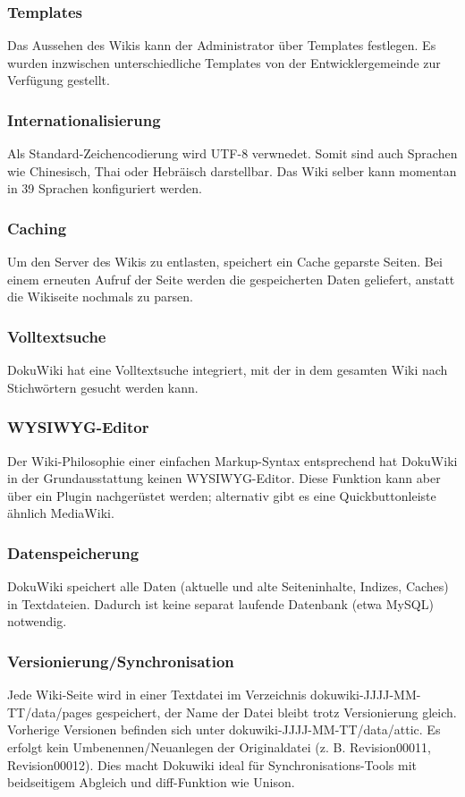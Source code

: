 \subsubsection{Templates}
Das Aussehen des Wikis kann der Administrator über Templates festlegen. Es wurden inzwischen unterschiedliche Templates von der Entwicklergemeinde zur Verfügung gestellt.
\subsubsection{Internationalisierung}
Als Standard-Zeichencodierung wird UTF-8 verwnedet. Somit sind auch Sprachen wie Chinesisch, Thai oder Hebräisch darstellbar. Das Wiki selber kann momentan in 39 Sprachen konfiguriert werden.
\subsubsection{Caching}
Um den Server des Wikis zu entlasten, speichert ein Cache geparste Seiten. Bei einem erneuten Aufruf der Seite werden die gespeicherten Daten geliefert, anstatt die Wikiseite nochmals zu parsen.
\subsubsection{Volltextsuche}
DokuWiki hat eine Volltextsuche integriert, mit der in dem gesamten Wiki nach Stichwörtern gesucht werden kann.
\subsubsection{WYSIWYG-Editor}
Der Wiki-Philosophie einer einfachen Markup-Syntax entsprechend hat DokuWiki in der Grundausstattung keinen WYSIWYG-Editor. Diese Funktion kann aber über ein Plugin nachgerüstet werden; alternativ gibt es eine Quickbuttonleiste ähnlich MediaWiki.
\subsubsection{Datenspeicherung}
DokuWiki speichert alle Daten (aktuelle und alte Seiteninhalte, Indizes, Caches) in Textdateien. Dadurch ist keine separat laufende Datenbank (etwa MySQL) notwendig.
\subsubsection{Versionierung/Synchronisation}
Jede Wiki-Seite wird in einer Textdatei im Verzeichnis dokuwiki-JJJJ-MM-TT/data/pages gespeichert, der Name der Datei bleibt trotz Versionierung gleich. Vorherige Versionen befinden sich unter dokuwiki-JJJJ-MM-TT/data/attic. Es erfolgt kein Umbenennen/Neuanlegen der Originaldatei (z. B. Revision00011, Revision00012). Dies macht Dokuwiki ideal für Synchronisations-Tools mit beidseitigem Abgleich und diff-Funktion wie Unison.
